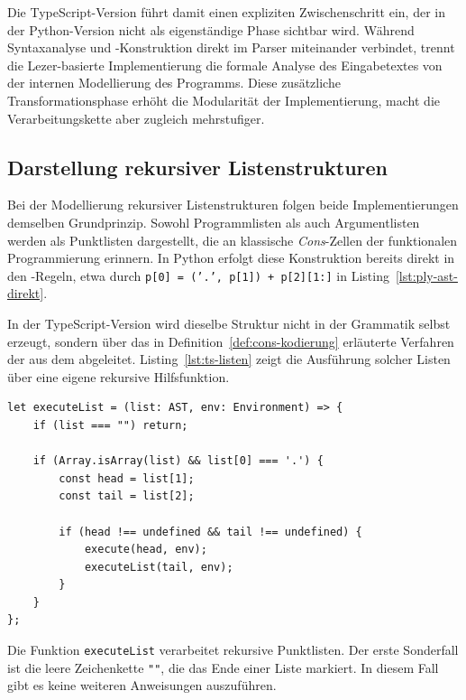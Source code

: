 Die TypeScript-Version führt damit einen expliziten Zwischenschritt ein, der in der Python-Version nicht als eigenständige Phase sichtbar wird. Während \emph{} Syntaxanalyse und -Konstruktion direkt im Parser miteinander verbindet, trennt die Lezer-basierte Implementierung die formale Analyse des Eingabetextes von der internen Modellierung des Programms. Diese zusätzliche Transformationsphase erhöht die Modularität der Implementierung, macht die Verarbeitungskette aber zugleich mehrstufiger.

\subsection{Darstellung rekursiver Listenstrukturen}

Bei der Modellierung rekursiver Listenstrukturen folgen beide Implementierungen demselben Grundprinzip. Sowohl Programmlisten als auch Argumentlisten werden als Punktlisten dargestellt, die an klassische \textit{Cons}-Zellen der funktionalen Programmierung erinnern. In Python erfolgt diese Konstruktion bereits direkt in den \emph{}-Regeln, etwa durch \texttt{p[0] = ('.', p[1]) + p[2][1:]} in Listing~\ref{lst:ply-ast-direkt}.

In der TypeScript-Version wird dieselbe Struktur nicht in der Grammatik selbst erzeugt, sondern über das in Definition~\ref{def:cons-kodierung} erläuterte Verfahren der  aus dem  abgeleitet. Listing~\ref{lst:ts-listen} zeigt die Ausführung solcher Listen über eine eigene rekursive Hilfsfunktion.

\begin{listing}[htbp]
\caption{Verarbeitung rekursiver Listen in TypeScript}
\label{lst:ts-listen}
\begin{verbatim}
let executeList = (list: AST, env: Environment) => {
    if (list === "") return;

    if (Array.isArray(list) && list[0] === '.') {
        const head = list[1];
        const tail = list[2];

        if (head !== undefined && tail !== undefined) {
            execute(head, env);
            executeList(tail, env);
        }
    }
};
\end{verbatim}
\end{listing}

Die Funktion \texttt{executeList} verarbeitet rekursive Punktlisten. Der erste Sonderfall ist die leere Zeichenkette \texttt{""}, die das Ende einer Liste markiert. In diesem Fall gibt es keine weiteren Anweisungen auszuführen.

